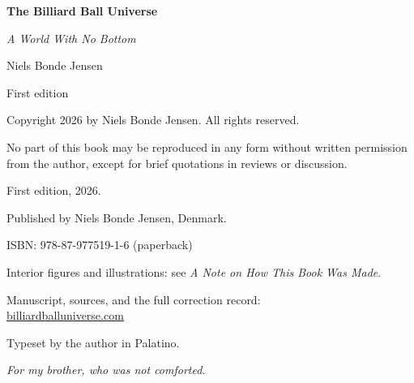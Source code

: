 \documentclass[fontsize=11pt,paper=a4,pagesize=auto,parskip=half-]{scrbook}
\begin{document}
\frontmatter
\begin{titlepage}
\centering
\vspace*{1.6in}
{\Huge\bfseries The Billiard Ball Universe\par}
\vspace{0.35in}
{\Large\itshape A World With No Bottom\par}
\vspace{1.2in}
{\large Niels Bonde Jensen\par}
\vfill
{\small First edition\par}
\vspace*{0.5in}
\end{titlepage}
\thispagestyle{empty}
\null\vfill
{\small\noindent
Copyright \textcopyright{} 2026 by Niels Bonde Jensen. All rights reserved.

\noindent No part of this book may be reproduced in any form without written
permission from the author, except for brief quotations in reviews or discussion.

\noindent First edition, 2026.

\noindent Published by Niels Bonde Jensen, Denmark.

\noindent ISBN: 978-87-977519-1-6 (paperback)

\noindent Interior figures and illustrations: see \emph{A Note on How This Book Was Made}.

\noindent Manuscript, sources, and the full correction record:\\
\url{billiardballuniverse.com}

\noindent Typeset by the author in Palatino.
\par}
\cleardoublepage
\thispagestyle{empty}
\null\vspace*{0.28\textheight}
\begin{center}
{\large\itshape For my brother, who was not comforted.}
\end{center}
\vfill
\cleardoublepage
\tableofcontents
\end{document}
